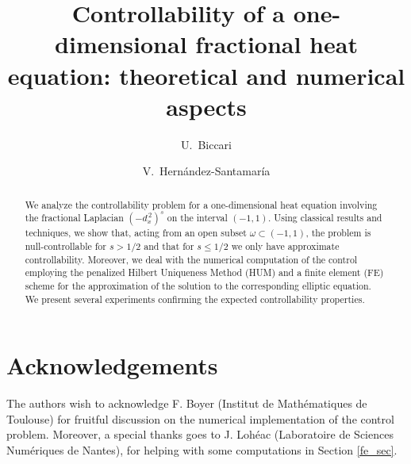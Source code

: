 \documentclass[preprint,1p]{amsart}
\title[Controllability fractional heat equation]{Controllability of a one-dimensional fractional heat equation: theoretical and numerical aspects}
\author{U.~Biccari}
\author{V.~Hern\'andez-Santamar\'ia}
\numberwithin{equation}{section}
\numberwithin{equation}{section}
\numberwithin{theorem}{section}
\numberwithin{remark}{section}
\numberwithin{lemma}{section}
\numberwithin{proposition}{section}
\numberwithin{definition}{section}
\newcommand{\fl}[2]{(-d_x^{\,2})^{#1}#2}
\begin{document}


\maketitle

\begin{abstract}
We analyze the controllability problem for a one-dimensional heat equation involving the fractional Laplacian $\fl{s}{}$ on the interval $(-1,1)$. Using classical results and techniques, we show that, acting from an open subset $\omega\subset(-1,1)$, the problem is null-controllable for $s>1/2$ and that for $s\leq 1/2$ we only have approximate controllability. Moreover, we deal with the numerical computation of the control employing the penalized Hilbert Uniqueness Method (HUM) and a finite element (FE) scheme for the approximation of the solution to the corresponding elliptic equation. We present several experiments confirming the expected controllability properties.
\end{abstract}








\section*{Acknowledgements}
The authors wish to acknowledge F. Boyer (Institut de Math\'ematiques de Toulouse) for fruitful discussion on the numerical implementation of the control problem. Moreover, a special thanks goes to J. Loh\'eac (Laboratoire de Sciences Num\'eriques de Nantes), for helping with some computations in Section \ref{fe_sec}.  


\end{document}
